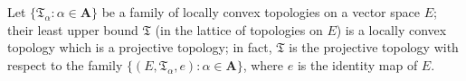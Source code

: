 Let $\{\mathfrak{T}_\alpha: \alpha \in \mathbf{A}\}$ be a family of locally convex topologies on a vector space $E$; their least upper bound $\mathfrak{T}$ (in the lattice of topologies on $E$) is a locally convex topology which is a projective topology; in fact, $\mathfrak{T}$ is the projective topology with respect to the family $\{(E, \mathfrak{T}_\alpha, e): \alpha \in \mathbf{A}\}$, where $e$ is the identity map of $E$.
